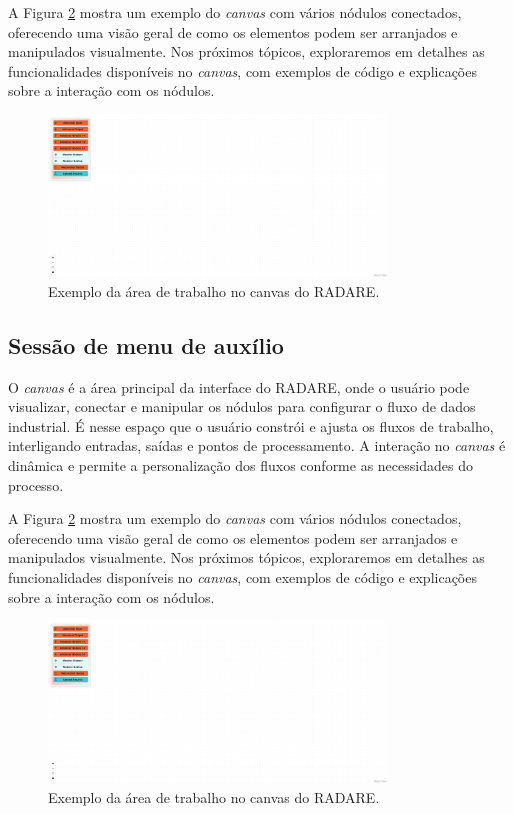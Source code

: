 A Figura \ref{Fig:CanvasArea} mostra um exemplo do \textit{canvas} com vários nódulos conectados, oferecendo uma visão geral de como os elementos podem ser arranjados e manipulados visualmente. Nos próximos tópicos, exploraremos em detalhes as funcionalidades disponíveis no \textit{canvas}, com exemplos de código e explicações sobre a interação com os nódulos.

\begin{figure}[htbp]
    \centering
    \includegraphics[width=0.8\textwidth]{figuras/empty-canvas.png}
    \caption{Exemplo da área de trabalho no canvas do RADARE.}
    \label{Fig:CanvasArea}
\end{figure}

\subsection{Sessão de menu de auxílio}

O \textit{canvas} é a área principal da interface do RADARE, onde o usuário pode visualizar, conectar e manipular os nódulos para configurar o fluxo de dados industrial. É nesse espaço que o usuário constrói e ajusta os fluxos de trabalho, interligando entradas, saídas e pontos de processamento. A interação no \textit{canvas} é dinâmica e permite a personalização dos fluxos conforme as necessidades do processo.

A Figura \ref{Fig:CanvasArea} mostra um exemplo do \textit{canvas} com vários nódulos conectados, oferecendo uma visão geral de como os elementos podem ser arranjados e manipulados visualmente. Nos próximos tópicos, exploraremos em detalhes as funcionalidades disponíveis no \textit{canvas}, com exemplos de código e explicações sobre a interação com os nódulos.

\begin{figure}[htbp]
    \centering
    \includegraphics[width=0.8\textwidth]{figuras/empty-canvas.png}
    \caption{Exemplo da área de trabalho no canvas do RADARE.}
    \label{Fig:CanvasArea}
\end{figure}

